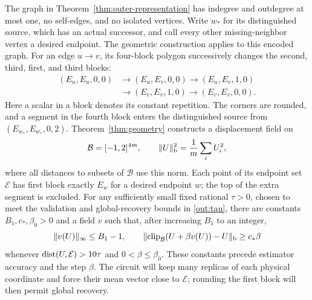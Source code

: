The graph in Theorem~\ref{thm:outer-representation} has indegree and
outdegree at most one, no self-edges, and no isolated vertices. Write
$w_*$ for its distinguished source, which has an actual successor, and
call every other missing-neighbor vertex a desired endpoint. The
geometric construction applies to this encoded graph. For an edge
$u\to v$, its four-block polygon successively changes the second, third,
first, and third blocks:
\[
 \begin{aligned}
 (E_u,E_u,0,0)&\longrightarrow(E_u,E_v,0,0)
 \longrightarrow(E_u,E_v,1,0)\\
 &\longrightarrow(E_v,E_v,1,0)
 \longrightarrow(E_v,E_v,0,0).
 \end{aligned}
\]
Here a scalar in a block denotes its constant repetition. The corners
are rounded, and a segment in the fourth block enters the distinguished
source from $(E_{w_*},E_{w_*},0,2)$.
Theorem~\ref{thm:geometry} constructs a displacement field on
\[
 \mathcal B=[-1,2]^{4m},\qquad
 \lVert U\rVert_{\rm b}^2=\frac1m\sum_i U_i^2,
\]
where all distances to subsets of $\mathcal B$ use this norm. Each point
of its endpoint set $\mathcal E$ has first block exactly $E_w$ for a desired
endpoint $w$; the top of the extra segment is excluded. For any sufficiently
small fixed rational $\tau>0$, chosen to meet the validation and
global-recovery bounds in \eqref{out:tau}, there are constants
$B_1,c_*,\beta_0>0$ and a field
$v$ such that, after increasing $B_1$ to an integer,
\begin{equation}\label{out:geometry-displacement}
 \lVert v(U)\rVert_\infty\leq B_1-1,\qquad
 \lVert \operatorname{clip}_{\mathcal B}(U+\beta v(U))-U\rVert_{\rm b}\geq c_*\beta
\end{equation}
whenever $\operatorname{dist}(U,\mathcal E)>10\tau$ and $0<\beta\leq\beta_0$.
These constants precede estimator accuracy and the step $\beta$.
The circuit will keep many replicas of each physical coordinate and
force their mean vector close to $\mathcal E$; rounding the first block
will then permit global recovery.

